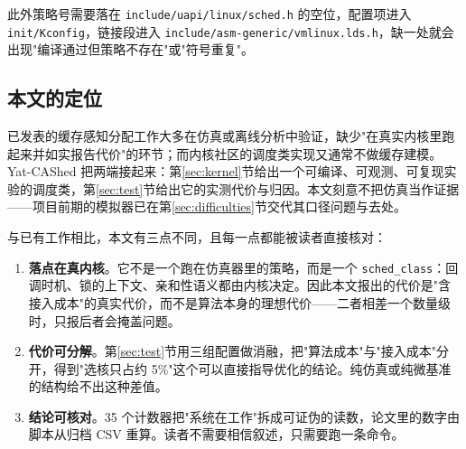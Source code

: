 此外策略号需要落在 \texttt{include/uapi/linux/sched.h} 的空位，配置项进入 \texttt{init/Kconfig}，链接段进入 \texttt{include/asm-generic/vmlinux.lds.h}，缺一处就会出现"编译通过但策略不存在"或"符号重复"。

\subsection{本文的定位}

已发表的缓存感知分配工作大多在仿真或离线分析中验证，缺少"在真实内核里跑起来并如实报告代价"的环节；而内核社区的调度类实现又通常不做缓存建模。Yat-CAShed 把两端接起来：第\ref{sec:kernel}节给出一个可编译、可观测、可复现实验的调度类，第\ref{sec:test}节给出它的实测代价与归因。本文刻意不把仿真当作证据——项目前期的模拟器已在第\ref{sec:difficulties}节交代其口径问题与去处。

与已有工作相比，本文有三点不同，且每一点都能被读者直接核对：

\begin{enumerate}
  \item \textbf{落点在真内核}。它不是一个跑在仿真器里的策略，而是一个 \texttt{sched\_class}：回调时机、锁的上下文、亲和性语义都由内核决定。因此本文报出的代价是"含接入成本"的真实代价，而不是算法本身的理想代价——二者相差一个数量级时，只报后者会掩盖问题。
  \item \textbf{代价可分解}。第\ref{sec:test}节用三组配置做消融，把"算法成本"与"接入成本"分开，得到"选核只占约 5\%"这个可以直接指导优化的结论。纯仿真或纯微基准的结构给不出这种差值。
  \item \textbf{结论可核对}。35 个计数器把"系统在工作"拆成可证伪的读数，论文里的数字由脚本从归档 CSV 重算。读者不需要相信叙述，只需要跑一条命令。
\end{enumerate}
